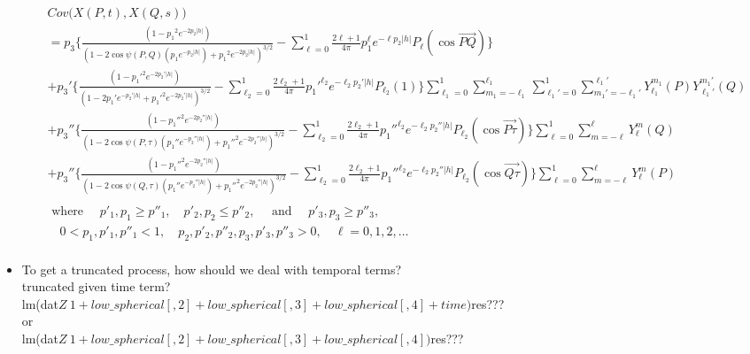 \documentclass[11pt]{article}
\begin{document}
\begin{itemize}
{\begin{align*}
&Cov\biggl(X(P,t), X(Q,s)\biggl)\\ 
&= p_3\biggl\{ \frac{(1 - {p_1}^2 e^{-2 p_2 \lvert h \lvert})}{(1-2 \cos{\psi(P, Q)} (p_1 e^{-p_2 \lvert h \lvert}) + {p_1}^2 e^{-2p_2 \lvert h \lvert})^{3/2}} - \sum_{\ell=0}^{1} \frac{2\ell + 1}{4\pi} p_1^\ell e^{-\ell p_2 |h|} P_\ell(\cos{\overrightarrow{PQ}}) \biggl\}\\
&+  p_3' \biggl\{ \frac{(1 - {p_1'}^2 e^{-2 p_2' \lvert h \lvert})}{(1-2 p_1' e^{-p_2' \lvert h \lvert} + {p_1'}^2 e^{-2p_2' \lvert h \lvert})^{3/2}} - \sum_{\ell_2=0}^{1} \frac{2\ell_2 + 1}{4\pi} p_1'^{\ell_2} e^{-{\ell_2} p_2' |h|} P_{\ell_2}(1) \biggl \} \sum_{\ell_1=0}^{1} \sum_{m_1=-\ell_1}^{\ell_1} \sum_{{\ell_1}'=0}^{1} \sum_{{m_1}'=-{\ell_1}'}^{{\ell_1}'} Y_{\ell_1}^{m_1}(P) Y_{{\ell_1}'}^{{m_1}'}(Q)\\
&+ p_3'' \biggl\{ \frac{(1 - {p_1''}^2 e^{-2 p_2'' \lvert h \lvert})}{(1-2 \cos{\psi(P,\tau)} (p_1'' e^{-p_2'' \lvert h \lvert}) + {p_1''}^2 e^{-2p_2'' \lvert h \lvert})^{3/2}} - \sum_{\ell_2=0}^{1}  \frac{2\ell_2 + 1}{4\pi} p_1''^{\ell_2} e^{-\ell_2 p_2'' |h|} P_{\ell_2}(\cos{\overrightarrow{P\tau}})\biggl\} \sum_{\ell=0}^{1} \sum_{m=-\ell}^{\ell} Y_{\ell}^{m}(Q)\\
&+ p_3'' \biggl\{ \frac{(1 - {p_1''}^2 e^{-2 p_2'' \lvert h \lvert})}{(1-2 \cos{\psi(Q,\tau)} (p_1'' e^{-p_2'' \lvert h \lvert}) + {p_1''}^2 e^{-2p_2'' \lvert h \lvert})^{3/2}} - \sum_{\ell_2=0}^{1}  \frac{2\ell_2 + 1}{4\pi} p_1''^{\ell_2} e^{-\ell_2 p_2'' |h|} P_{\ell_2}(\cos{\overrightarrow{Q\tau}}) \biggl \} \sum_{\ell=0}^{1} \sum_{m=-\ell}^{\ell} Y_{\ell}^{m}(P)\\
\\
&\text{ where } \quad p'_1, p_1 \ge p''_1, \quad p'_2, p_2 \le p''_2, \quad \text{ and } \quad p'_3, p_3 \ge p''_3,\\
&\quad 0<p_1,p'_1,p''_1<1, \quad p_2, p'_2, p''_2, p_3, p'_3, p''_3 > 0, \quad \ell=0,1,2,\dots\\
\end{align*}
}

\pagebreak

\item
To get a truncated process, how should we deal with temporal terms?\\
truncated given time term?\\
lm(dat$Z ~ 1 + low\_spherical[,2] + low\_spherical[,3] + low\_spherical[,4] + time)$res???\\
or\\
lm(dat$Z ~ 1 + low\_spherical[,2] + low\_spherical[,3] + low\_spherical[,4] )$res???\\


\end{itemize}
\end{document}
